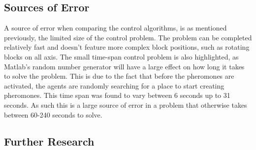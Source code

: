 \subsection{Sources of Error}
A source of error when comparing the control algorithms, is as mentioned previously, the limited size of the control problem. The problem can be completed relatively fast and doesn't feature more complex block positions, such as rotating blocks on all axis. The small time-span control problem is also highlighted, as Matlab's random number generator will have a large effect on how long it takes to solve the problem. This is due to the fact that before the pheromones are activated, the agents are randomly searching for a place to start creating pheromones. This time span was found to vary between 6 seconds up to 31 seconds. As such this is a large source of error in a problem that otherwise takes between 60-240 seconds to solve. 


\subsection{Further Research}




